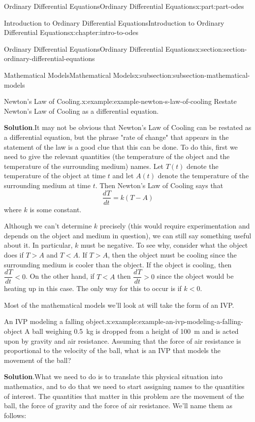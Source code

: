 \documentclass[twoside,10pt,]{book}
\newcommand{\blocktitlefont}{\relax}
\numberwithin{equation}{part}
\providecommand{\dv}[3][]{\dfrac{d^{#1} #2}{d #3^{#1}}}
\newcommand{\lt}{<}
\newcommand{\gt}{>}
\begin{document}
\begin{partptx}{Ordinary Differential Equations}{}{Ordinary Differential Equations}{}{}{x:part:part-odes}
\begin{chapterptx}{Introduction to Ordinary Differential Equations}{}{Introduction to Ordinary Differential Equations}{}{}{x:chapter:intro-to-odes}
\begin{sectionptx}{Ordinary Differential Equations}{}{Ordinary Differential Equations}{}{}{x:section:section-ordinary-differential-equations}
\begin{subsectionptx}{Mathematical Models}{}{Mathematical Models}{}{}{x:subsection:subsection-mathematical-models}
\begin{example}{Newton's Law of Cooling.}{x:example:example-newton-s-law-of-cooling}
Restate Newton's Law of Cooling as a differential equation.%
\par\smallskip%
\noindent\textbf{\blocktitlefont Solution}.\hypertarget{g:solution:idp105548816153248}{}\quad{}It may not be obvious that Newton's Law of Cooling can be restated as a differential equation, but the phrase "rate of change" that appears in the statement of the law is a good clue that this can be done. To do this, first we need to give the relevant quantities (the temperature of the object and the temperature of the surrounding medium) names. Let \(T(t)\) denote the temperature of the object at time \(t\) and let \(A(t)\) denote the temperature of the surrounding medium at time \(t\). Then Newton's Law of Cooling says that%
\begin{equation*}
\dv{T}{t} = k(T-A)
\end{equation*}
where \(k\) is some constant.%
\par
Although we can't determine \(k\) precisely (this would require experimentation and depends on the object and medium in question), we can still say something useful about it. In particular, \(k\) must be negative. To see why, consider what the object does if \(T\gt A\) and \(T\lt A\). If \(T\gt A\), then the object must be cooling since the surrounding medium is cooler than the object. If the object is cooling, then \(\dv{T}{t}\lt0\). On the other hand, if \(T\lt A\) then \(\dv{T}{t}\gt0\) since the object would be heating up in this case. The only way for this to occur is if \(k\lt0\).%
\end{example}
Most of the mathematical models we'll look at will take the form of an IVP.%
\begin{example}{An IVP modeling a falling object.}{x:example:example-an-ivp-modeling-a-falling-object}%
A ball weighing \SI{0.5}{\kilo\gram} is dropped from a height of \SI{100}{\meter} and is acted upon by gravity and air resistance. Assuming that the force of air resistance is proportional to the velocity of the ball, what is an IVP that models the movement of the ball?%
\par\smallskip%
\noindent\textbf{\blocktitlefont Solution}.\hypertarget{g:solution:idp105548816326176}{}\quad{}What we need to do is to translate this physical situation into mathematics, and to do that we need to start assigning names to the quantities of interest. The quantities that matter in this problem are the movement of the ball, the force of gravity and the force of air resistance. We'll name them as follows:%
\begin{align*}

\end{align*}
\end{example}
\end{subsectionptx}
\end{sectionptx}
\end{chapterptx}
\end{partptx}
\end{document}
